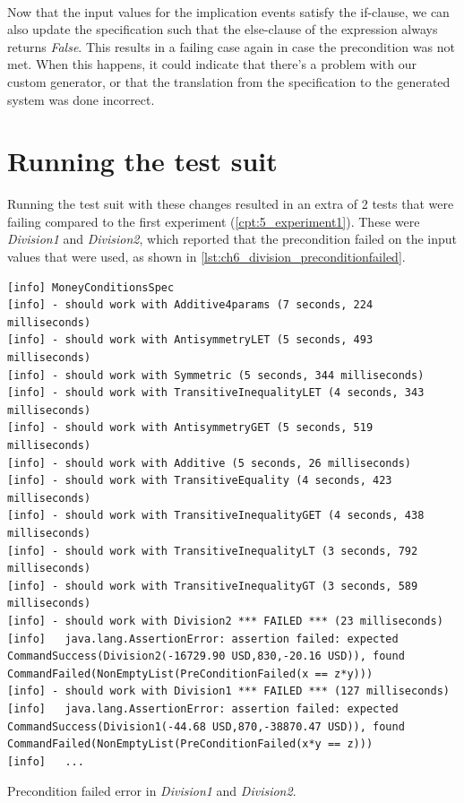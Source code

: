 \\
Now that the input values for the implication events satisfy the if-clause, we can also update the specification such that the else-clause of the expression always returns \textit{False}. This results in a failing case again in case the precondition was not met. When this happens, it could indicate that there's a problem with our custom generator, or that the translation from the specification to the generated system was done incorrect.

\section{Running the test suit}
Running the test suit with these changes resulted in an extra of 2 tests that were failing compared to the first experiment (\autoref{cpt:5_experiment1}). These were \textit{Division1} and \textit{Division2}, which reported that the precondition failed on the input values that were used, as shown in \autoref{lst:ch6_division_preconditionfailed}.
\\
\begin{sourcecode}[h!]
\begin{lstlisting}[language=Log]
[info] MoneyConditionsSpec
[info] - should work with Additive4params (7 seconds, 224 milliseconds)
[info] - should work with AntisymmetryLET (5 seconds, 493 milliseconds)
[info] - should work with Symmetric (5 seconds, 344 milliseconds)
[info] - should work with TransitiveInequalityLET (4 seconds, 343 milliseconds)
[info] - should work with AntisymmetryGET (5 seconds, 519 milliseconds)
[info] - should work with Additive (5 seconds, 26 milliseconds)
[info] - should work with TransitiveEquality (4 seconds, 423 milliseconds)
[info] - should work with TransitiveInequalityGET (4 seconds, 438 milliseconds)
[info] - should work with TransitiveInequalityLT (3 seconds, 792 milliseconds)
[info] - should work with TransitiveInequalityGT (3 seconds, 589 milliseconds)
[info] - should work with Division2 *** FAILED *** (23 milliseconds)
[info]   java.lang.AssertionError: assertion failed: expected CommandSuccess(Division2(-16729.90 USD,830,-20.16 USD)), found CommandFailed(NonEmptyList(PreConditionFailed(x == z*y)))
[info] - should work with Division1 *** FAILED *** (127 milliseconds)
[info]   java.lang.AssertionError: assertion failed: expected CommandSuccess(Division1(-44.68 USD,870,-38870.47 USD)), found CommandFailed(NonEmptyList(PreConditionFailed(x*y == z)))
[info]   ...
\end{lstlisting}
\caption{Precondition failed error in \textit{Division1} and \textit{Division2}.}
\label{lst:ch6_division_preconditionfailed}
\end{sourcecode}

